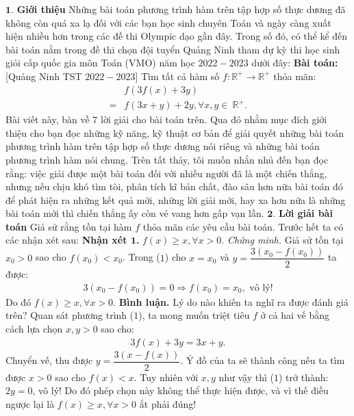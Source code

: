 \begin{multicols}{2}
	$\pmb{1.}$	\textbf{\color{hoccungpi}Giới thiệu}
	\vskip 0.1cm
	Những bài toán phương trình hàm trên tập hợp số thực dương đã không còn quá xa lạ đối với các bạn học sinh chuyên Toán và ngày càng xuất hiện nhiều hơn trong các đề thi Olympic dạo gần đây. Trong số đó, có thể kể đến bài toán nằm trong đề thi chọn đội tuyển Quảng Ninh tham dự kỳ thi học sinh giỏi cấp quốc gia môn Toán (VMO) năm học $2022-2023$ dưới đây: 
	\vskip 0.1cm
	\textbf{\color{hoccungpi}Bài toán:} [Quảng Ninh TST $2022 - 2023$]
	\vskip 0.1cm
	Tìm tất cả hàm số $f: \mathbb{R^+} \to \mathbb{R^+}$ thỏa mãn: 
	\begin{align*}
		&f(3f(x) + 3y) \\
		= &f(3x + y) + 2y,\forall x,y \in \ \mathbb{R^+}. \tag{$1$}
	\end{align*}
	Bài viết này, bàn về $7$ lời giải cho bài toán trên. Qua đó nhằm mục đích giới thiệu cho bạn đọc những kỹ năng, kỹ thuật cơ bản để giải quyết những bài toán phương trình hàm trên tập hợp số thực dương nói riêng và những bài toán phương trình hàm nói chung. Trên tất thảy, tôi muốn nhắn nhủ đến bạn đọc rằng: việc giải được một bài toán đối với nhiều người đã là một chiến thắng, nhưng nếu chịu khó tìm tòi, phân tích kĩ bản chất, đào sâu hơn nữa bài toán đó để phát hiện ra những kết quả mới, những lời giải mới, hay xa hơn nữa là những bài toán mới thì chiến thắng ấy còn vẻ vang hơn gấp vạn lần.
	\vskip 0.1cm
	$\pmb{2.}$	\textbf{\color{hoccungpi}Lời giải bài toán}
	\vskip 0.1cm
	Giả sử rằng tồn tại hàm $f$ thỏa mãn các yêu cầu bài toán. Trước hết ta có các nhận xét sau:
	\vskip 0.1cm
	\textbf{\color{hoccungpi}Nhận xét $\pmb1$.} $f(x) \ge x, \forall x > 0$.
	\vskip 0.1cm   
	\textit{Chứng minh.}  Giả sử tồn tại $x_0 > 0$  sao cho $f(x_0) < x_0$. Trong ($1$) cho $x = x_0$  và  $y = \dfrac{3\left(x_0 -f(x_0)\right)}{2}$ ta được: 
	\begin{align*}
		3({x_0} - f({x_0})) = 0 \Rightarrow f({x_0}) = {x_0}, \text{ vô lý!}
	\end{align*}
	Do đó $f(x) \ge x, \forall x > 0$.
	\vskip 0.1cm  
	\textbf{\color{hoccungpi}Bình luận.}  Lý do nào khiến ta nghĩ ra được đánh giá trên? Quan sát phương trình ($1$), ta mong muốn triệt tiêu $f$  ở cả hai vế bằng cách lựa chọn $x, y > 0$  sao cho: 
	\begin{align*}
		3f(x) + 3y = 3x + y.
	\end{align*}
	Chuyển vế, thu được $y = \dfrac{3\left(x - f(x)\right)}{2}$.  Ý đồ của ta sẽ thành công nếu ta tìm được $x > 0$  sao cho  $f(x) < x$. Tuy nhiên với $x,y$  như vậy thì ($1$) trở thành: $2y = 0$, vô lý! Do đó phép chọn này không thể thực hiện được, và vì thế điều ngược lại là $f(x) \ge x , \forall x > 0$  ắt phải đúng!

\end{multicols}
